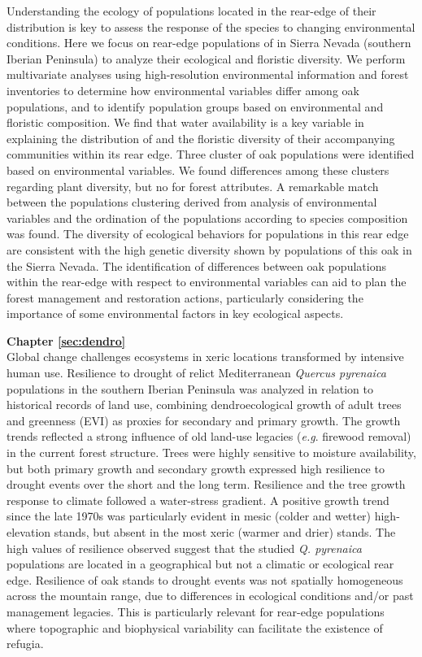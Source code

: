 Understanding the ecology of populations located in the rear-edge of their distribution is key to assess the response of the species to changing environmental conditions. Here we focus on rear-edge populations of \Qpy in Sierra Nevada (southern Iberian Peninsula) to analyze their ecological and floristic diversity. We perform multivariate analyses using high-resolution environmental information and forest inventories to determine how environmental variables differ among oak populations, and to identify population groups based on environmental and floristic composition.
We find that water availability is a key variable in explaining the distribution of \Qp and the floristic diversity of their accompanying communities within its rear edge. Three cluster of oak populations were identified based on environmental variables. We found differences among these clusters regarding plant diversity, but no for forest attributes. A remarkable match between the populations clustering derived from analysis of environmental variables and the ordination of the populations according to species composition was found.
The diversity of ecological behaviors for \Qp populations in this rear edge are consistent with the high genetic diversity shown by populations of this oak in the Sierra Nevada. The identification of differences between oak populations within the rear-edge with respect to environmental variables can aid to plan the forest management and restoration actions, particularly considering the importance of some environmental factors in key ecological aspects.

\textbf{Chapter \ref{sec:dendro}} \\[0.2em]
Global change challenges ecosystems in xeric locations transformed by intensive human use. Resilience to drought of relict Mediterranean \emph{Quercus pyrenaica} populations in the southern Iberian Peninsula was analyzed in relation to historical records of land use, combining dendroecological growth of adult trees and greenness (EVI) as proxies for secondary and primary growth. The growth trends reflected a strong influence of old land-use legacies (\emph{e.g}. firewood removal) in the current forest structure. Trees were highly sensitive to moisture availability, but both primary growth and secondary growth expressed high resilience to drought events over the short and the long term. Resilience and the tree growth response to climate followed a water-stress gradient. A positive growth trend since the late 1970s was particularly evident in mesic (colder and wetter) high-elevation stands, but absent in the most xeric (warmer and drier) stands. The high values of resilience observed suggest that the studied \emph{Q. pyrenaica} populations are located in a geographical but not a climatic or ecological rear edge. Resilience of oak stands to drought events was not spatially homogeneous across the mountain range, due to differences in ecological conditions and/or past management legacies. This is particularly relevant for rear-edge populations where topographic and biophysical variability can facilitate the existence of refugia.
